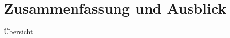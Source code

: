 \documentclass[aspectratio=169, 12pt]{beamer}
\begin{document}
%       

\section{Zusammenfassung und Ausblick}

\begin{frame}{Übersicht}
  \tableofcontents[currentsection]
\end{frame}

\end{document}
